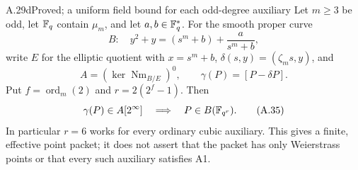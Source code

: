 \begin{claim}{A.29d}{Proved; a uniform field bound for each odd-degree auxiliary}
Let $m\ge3$ be odd, let $\mathbb F_q$ contain $\mu_m$, and let
$a,b\in\mathbb F_q^*$. For the smooth proper curve
\[
 B:\quad y^2+y=(s^m+b)+\frac{a}{s^m+b},
\]
write $E$ for the elliptic quotient with $x=s^m+b$,
$\delta(s,y)=(\zeta_m s,y)$, and
\[
 A=(\ker\operatorname{Nm}_{B/E})^0,
 \qquad \gamma(P)=[P-\delta P].
\]
Put $f=\operatorname{ord}_m(2)$ and $r=2(2^f-1)$.
Then
\[
 \gamma(P)\in A[2^\infty]
           \quad\Longrightarrow\quad P\in B(\mathbb F_{q^r}). 
                                                               \tag{A.35}
\]
In particular $r=6$ works for every ordinary cubic
auxiliary. This gives a finite, effective point packet;
it does not assert that the packet has only Weierstrass
points or that every such auxiliary satisfies A1.
\end{claim}
